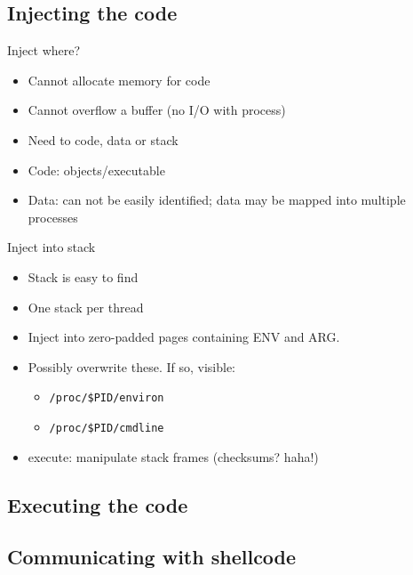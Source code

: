 \documentclass{beamer}
\newenvironment{itemizeframe}[1]
  {\begin{frame}{#1}\startitemizeframe}
  {\stopitemizeframe\end{frame}}
\newcommand\startitemizeframe{\begin{itemize}}
\newcommand\stopitemizeframe{\end{itemize}}
\begin{document}

	\subsection{Injecting the code}

		\begin{itemizeframe}{Inject where?}
			\item Cannot allocate memory for code
			\item Cannot overflow a buffer (no I/O with process)
			\item Need to  code, data or stack
			\item Code:  objects/executable
			\item Data: can not be easily identified; data may be mapped into multiple processes
		\end{itemizeframe}
			
		\begin{itemizeframe}{Inject into stack}
			\item Stack is easy to find
			\item One stack per thread
			\item Inject into zero-padded pages containing ENV and ARG.
			\item Possibly overwrite these. If so, visible:
			\begin{itemize}
				\item \texttt{/proc/\$PID/environ}
				\item \texttt{/proc/\$PID/cmdline}
			\end{itemize}
			\item execute: manipulate stack frames (checksums? haha!)
		\end{itemizeframe}

	\subsection{Executing the code}

	\subsection{Communicating with shellcode}
\end{document}
